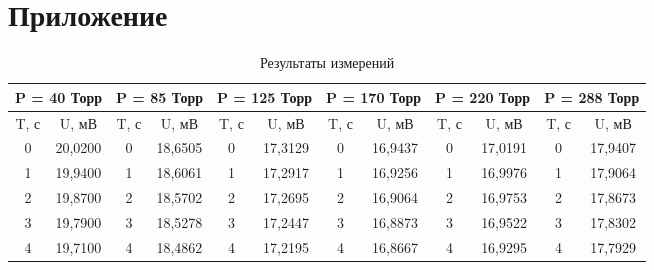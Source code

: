 \documentclass[a4paper,12pt]{article} %
\begin{document}
\section{Приложение}
\begin{longtable}[c]{cccccccccc|c|c|}
		\caption{Результаты измерений}
	\label{tab:my-table}\\
	\hline
	\multicolumn{2}{|c|}{P = 40 Торр} & \multicolumn{2}{c|}{P = 85 Торр} & \multicolumn{2}{c|}{P = 125 Торр} & \multicolumn{2}{c|}{P = 170 Торр} & \multicolumn{2}{c|}{P = 220 Торр} & \multicolumn{2}{c|}{P = 288 Торр} \\ \hline
	\endfirsthead
	\endhead
	\multicolumn{1}{|c|}{T, с} & \multicolumn{1}{c|}{U, мВ} & \multicolumn{1}{c|}{T, с} & \multicolumn{1}{c|}{U, мВ} & \multicolumn{1}{c|}{T, с} & \multicolumn{1}{c|}{U, мВ} & \multicolumn{1}{c|}{T, с} & \multicolumn{1}{c|}{U, мВ} & \multicolumn{1}{c|}{T, с} & U, мВ & T, с & U, мВ \\ \hline
	\multicolumn{1}{|c|}{0} & \multicolumn{1}{c|}{20,0200} & \multicolumn{1}{c|}{0} & \multicolumn{1}{c|}{18,6505} & \multicolumn{1}{c|}{0} & \multicolumn{1}{c|}{17,3129} & \multicolumn{1}{c|}{0} & \multicolumn{1}{c|}{16,9437} & \multicolumn{1}{c|}{0} & 17,0191 & 0 & 17,9407 \\ \hline
	\multicolumn{1}{|c|}{1} & \multicolumn{1}{c|}{19,9400} & \multicolumn{1}{c|}{1} & \multicolumn{1}{c|}{18,6061} & \multicolumn{1}{c|}{1} & \multicolumn{1}{c|}{17,2917} & \multicolumn{1}{c|}{1} & \multicolumn{1}{c|}{16,9256} & \multicolumn{1}{c|}{1} & 16,9976 & 1 & 17,9064 \\ \hline
	\multicolumn{1}{|c|}{2} & \multicolumn{1}{c|}{19,8700} & \multicolumn{1}{c|}{2} & \multicolumn{1}{c|}{18,5702} & \multicolumn{1}{c|}{2} & \multicolumn{1}{c|}{17,2695} & \multicolumn{1}{c|}{2} & \multicolumn{1}{c|}{16,9064} & \multicolumn{1}{c|}{2} & 16,9753 & 2 & 17,8673 \\ \hline
	\multicolumn{1}{|c|}{3} & \multicolumn{1}{c|}{19,7900} & \multicolumn{1}{c|}{3} & \multicolumn{1}{c|}{18,5278} & \multicolumn{1}{c|}{3} & \multicolumn{1}{c|}{17,2447} & \multicolumn{1}{c|}{3} & \multicolumn{1}{c|}{16,8873} & \multicolumn{1}{c|}{3} & 16,9522 & 3 & 17,8302 \\ \hline
	\multicolumn{1}{|c|}{4} & \multicolumn{1}{c|}{19,7100} & \multicolumn{1}{c|}{4} & \multicolumn{1}{c|}{18,4862} & \multicolumn{1}{c|}{4} & \multicolumn{1}{c|}{17,2195} & \multicolumn{1}{c|}{4} & \multicolumn{1}{c|}{16,8667} & \multicolumn{1}{c|}{4} & 16,9295 & 4 & 17,7929 \\ \hline

\end{longtable}
\end{document}
